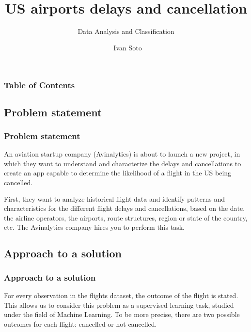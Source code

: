 \documentclass{beamer}
\title[Analysis] %
{US airports delays and cancellation}
\subtitle{Data Analysis and Classification}
\author[Ivan Soto] %
{~Ivan Soto }
\institute[Universities Here and There] %
{
  Introduction to Data Science\\
  ITESM Campus Queretaro
}
\begin{document}
	\begin{frame}
		\frame{\titlepage}
	\end{frame}
	\begin{frame}
		\frametitle{Table of Contents}
		\tableofcontents[currentsection]
	\end{frame}
	\begin{frame}
		\section[Section]{Problem statement}
		\frametitle{Problem statement}
		An aviation startup company (Avinalytics) is about to launch a new project, in which they want to understand and characterize the delays and cancellations to create an app capable to determine the likelihood of a flight in the US being cancelled.

		First, they want to analyze historical flight data and identify patterns and characteristics for the different flight delays and cancellations, based on the date, the airline operators, the airports, route structures, region or state of the country, etc. The Avinalytics company hires you to perform this task.
	\end{frame}
	\begin{frame}
		\section[Section]{Approach to a solution}
		\frametitle{Approach to a solution}
		For every observation in the flights dataset, the outcome of the flight is
	    stated. This allows us to consider this problem as a supervised learning task,
	    studied under the field of Machine Learning.
	    To be more precise, there are two possible outcomes for each flight: cancelled
	    or not cancelled.
	\end{frame}
\end{document}
